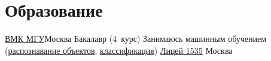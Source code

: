 \documentclass[11pt,a4paper,sans]{moderncv}
\begin{document}
\makecvtitle

\section{Образование}
        {\href{http://cs.msu.ru/}{ВМК МГУ}}{Москва}
        {Бакалавр (4~курс)}
        {Занимаюсь машинным обучением
          (\href{http://en.wikipedia.org/wiki/Pattern_recognition}{распознавание объектов},
          \href{http://en.wikipedia.org/wiki/Statistical_classification}{классификация})
        }
        {\href{http://liceum1535.ru/}{Лицей 1535}}
        {Москва}{}{}


\end{document}
